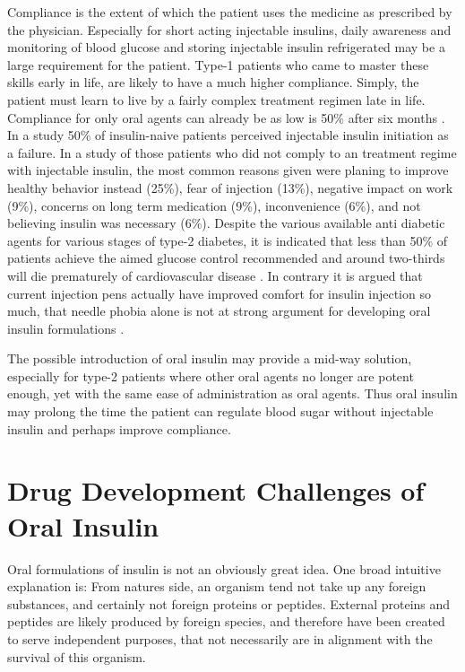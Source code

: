 Compliance is the extent of which the patient uses the medicine as prescribed by the physician. Especially for short acting injectable insulins, daily awareness and monitoring of blood glucose and storing injectable insulin refrigerated may be a large requirement for the patient. Type-1 patients who came to master these skills early in life, are likely to have a much higher compliance. Simply, the patient must learn to live by a fairly complex treatment regimen late in life. Compliance for only oral agents can already be as low is 50\% after six months \cite{garcia2013adherence}. In a study 50\% of insulin-naive patients perceived injectable insulin initiation as a failure. In a study of those patients who did not comply to an treatment regime with injectable insulin, the most common reasons given were planing to improve healthy behavior instead (25\%), fear of injection (13\%), negative impact on work (9\%), concerns on long term medication (9\%), inconvenience (6\%), and not believing insulin was necessary (6\%). Despite the various available anti diabetic agents for various stages of type-2 diabetes, it is indicated that less than 50\% of patients achieve the aimed glucose control recommended and around two-thirds will die prematurely of cardiovascular disease \cite{garcia2013adherence}. In contrary it is argued that current injection pens actually have improved comfort for insulin injection so much, that needle phobia alone is not at strong argument for developing oral insulin formulations \cite{maher2014formulation}.

The possible introduction of oral insulin may provide a mid-way solution, especially for type-2 patients where other oral agents no longer are potent enough, yet with the same ease of administration as oral agents. Thus oral insulin may prolong the time the patient can regulate blood sugar without injectable insulin and perhaps improve compliance.

\section{Drug Development Challenges of Oral Insulin}
Oral formulations of insulin is not an obviously great idea. One broad intuitive explanation is: From natures side, an organism tend not take up any foreign substances, and certainly not foreign proteins or peptides. External proteins and peptides are likely produced by foreign species, and therefore have been created to serve independent purposes, that not necessarily are in alignment with the survival of this organism.

